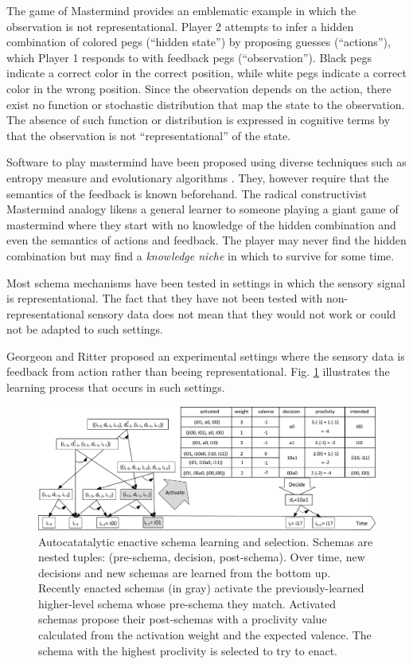 \documentclass[runningheads]{llncs}
\begin{document}
The game of Mastermind provides an emblematic example in which the observation is not representational. 
Player 2 attempts to infer a hidden combination of colored pegs (``hidden state'') by proposing guesses (``actions''), which Player 1 responds to with feedback pegs (``observation''). Black pegs indicate a correct color in the correct position, while white pegs indicate a correct color in the wrong position.
Since the observation depends on the action, there exist no function or stochastic distribution that map the state to the observation. 
The absence of such function or distribution is expressed in cognitive terms by that the observation is not ``representational'' of the state.

Software to play mastermind have been proposed using diverse techniques such as entropy measure and evolutionary algorithms \cite{cotta_entropy-driven_2010}.
They, however require that the semantics of the feedback is known beforehand. 
The radical constructivist Mastermind analogy likens a general learner to someone playing a giant game of mastermind where they start with no knowledge of the hidden combination and even the semantics of actions and feedback.
The player may never find the hidden combination but may find a \textit{knowledge niche} in which to survive for some time.

Most schema mechanisms have been tested in settings in which the sensory signal is representational.
The fact that they have not been tested with non-representational sensory data does not mean that they would not work or could not be adapted to such settings. 

Georgeon and Ritter \cite{georgeon_intrinsically-motivated_2012} proposed an experimental settings where the sensory data is feedback from action rather than beeing representational. 
Fig. \ref{fig:agent8} illustrates the learning process that occurs in such settings. 

\begin{figure}
	\centering
	\includegraphics[width=1.0\textwidth]{Figure_3_agent8.pdf}
	\caption{Autocatatalytic enactive schema learning and selection.
	Schemas are nested tuples: (pre-schema, decision, post-schema).
	Over time, new decisions and new schemas are learned from the bottom up. 
	Recently enacted schemas (in gray) activate the previously-learned higher-level schema whose pre-schema they match.
	Activated schemas propose their post-schemas with a proclivity value calculated from the activation weight and the expected valence.
	The schema with the highest proclivity is selected to try to enact.} 
	\label{fig:agent8}
\end{figure}
\end{document}
